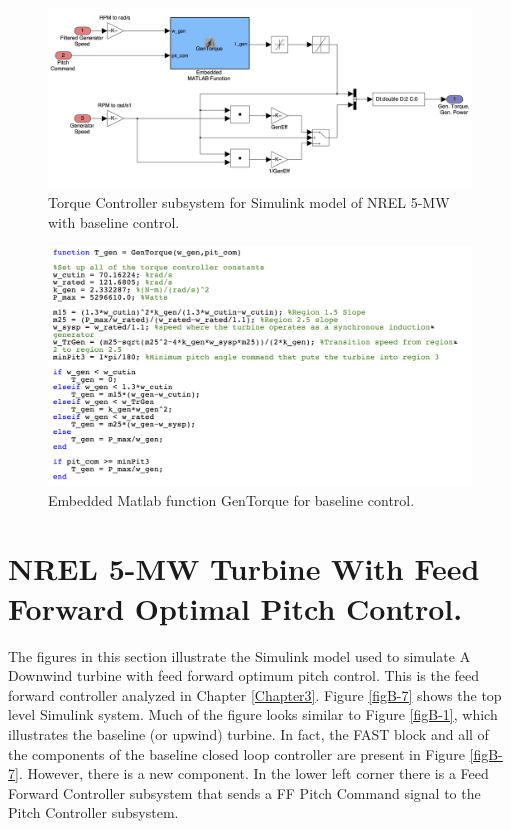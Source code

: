  \begin{figure}[ht]
	\centering
		\includegraphics[width=\linewidth]{Figures/AppendixBFigures/baseline5.png}
	\caption{Torque Controller subsystem for Simulink model of NREL 5-MW with baseline control.}
	\label{figB-5}
\end{figure}


\begin{figure}[ht]
	\centering
		\includegraphics[width=\linewidth]{Figures/AppendixBFigures/baseline9.png}
	\caption{Embedded Matlab function GenTorque for baseline control.}
	\label{figB-6}
\end{figure}




\section{NREL 5-MW Turbine With Feed Forward Optimal Pitch Control.} \label{sectionB-2}
The figures in this section illustrate the Simulink model used to simulate A Downwind turbine with feed forward optimum pitch control. This is the feed forward controller analyzed in Chapter \ref{Chapter3}. Figure \ref{figB-7} shows the top level Simulink system. Much of the figure looks similar to Figure \ref{figB-1}, which illustrates the baseline (or upwind) turbine. In fact, the FAST block and all of the components of the baseline closed loop controller are present in Figure \ref{figB-7}. However, there is a new component. In the lower left corner there is a Feed Forward Controller subsystem that sends a FF Pitch Command signal to the Pitch Controller subsystem.

